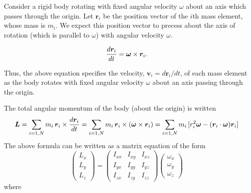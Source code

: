 
Consider a rigid body rotating with fixed angular velocity $\omega$ about an axis which passes through the origin.
Let ${\bm r}_i$ be the position vector of the $i$th mass element, whose 
mass is $m_i$. We expect this position vector to precess about the axis of rotation (which is parallel to $\omega$) 
with angular velocity $\omega$. 

\begin{displaymath} 
\frac{d{\bm r}_i}{dt} = \mbox{\boldmath$\omega$}\times {\bm r}_i. 
\end{displaymath}

Thus, the above equation specifies the velocity, ${\bm v}_i = d{\bm r}_i/dt$, of each mass element as the body rotates with fixed angular velocity $\omega$ about an axis passing through the origin. 


The total angular momentum of the body (about the origin) is written
\begin{displaymath} 
{\bm L} 
= \sum_{i=1,N} m_i\,{\bm r}_i\times\frac{d{\bm r}_i}{dt}
= \sum_{i=1,N} m_i\,{\bm r}_i\times ( \mbox{\boldmath$\omega$}\times {\bm r}_i )
= \sum_{i=1,N} m_i\, [ r_i^2 {\bm \omega} - ({\bm r}_i\cdot {\bm \omega}) {\bm r}_i ]
\end{displaymath}
The above formula can be written as a matrix equation of the form
\begin{displaymath} 
\left(\begin{array}{c}L_x\\ L_y\\ L_z\end{array}\right)=
\left(\begin{array}{ccc}
I_{xx} & I_{xy} & I_{xz} \\
I_{yx} & I_{yy} & I_{yz} \\
I_{zx} & I_{zy} & I_{zz} 
\end{array}\right) 
\left(\begin{array}{c}\omega_x\\ \omega_y\\ \omega_z\end{array}\right)
\end{displaymath}
where

